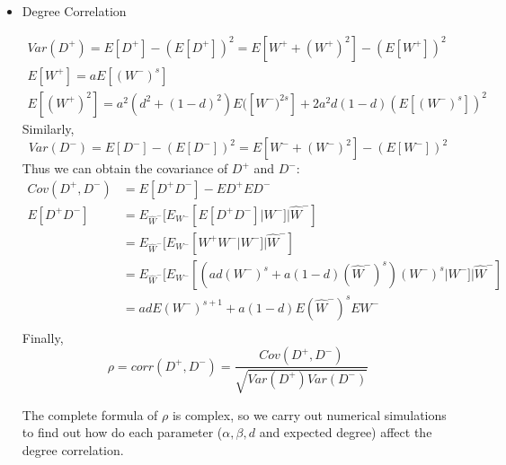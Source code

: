 \documentclass{article}
\begin{document}
\begin{itemize}
\begin{itemize}
	\item Degree Correlation

\begin{align*}
Var(D^+)=E[D^+]-(E[D^+])^2=E[W^+ +(W^+)^2] - (E[W^+])^2\\
E[W^+]=aE[(W^-)^s]\\
E[(W^+)^2]=a^2(d^2+(1-d)^2)E([W^-)^{2s}]+2a^2d(1-d)(E[(W^-)^s])^2
\end{align*}
Similarly,
$$Var(D^-)=E[D^-]-(E[D^-])^2=E[W^- +(W^-)^2] - (E[W^-])^2$$
Thus we can obtain the covariance of $D^+$ and $D^-$: 
\begin{align*}
Cov(D^+,D^-)&=E[D^+D^-]-ED^+ED^-\\
E[D^+D^-]&=E_{\hat{W}^-}[E_{W^-}[E[D^+D^-]|W^-]|\hat{W}^-]\\
&=E_{\hat{W}^-}[E_{W^-}[W^+W^-|W^-]|\hat{W}^-]\\
&=E_{\hat{W}^-}[E_{W^-}[(ad(W^-)^s+a(1-d)(\hat{W}^-)^s)(W^-)^s|W^-]|\hat{W}^-]\\
&=adE(W^-)^{s+1}+a(1-d)E(\hat{W}^-)^sEW^-\\
\end{align*}
Finally,
$$\rho =corr(D^+, D^-)=\frac{Cov(D^+, D^-)}{\sqrt{Var(D^+)Var(D^-)}}$$
\par The complete formula of $\rho$ is complex, so we carry out numerical simulations to find out how do each parameter ($\alpha, \beta, d$ and expected degree) affect the degree correlation. \\


\end{itemize}
\end{itemize}
\end{document}
